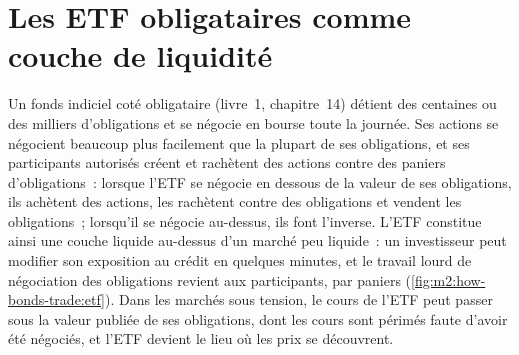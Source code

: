\section{Les ETF obligataires comme couche de liquidité}

Un fonds indiciel coté obligataire (livre~1, chapitre~14) détient des centaines ou des milliers
d'obligations et se négocie en bourse toute la journée. Ses actions se négocient beaucoup plus facilement que
la plupart de ses obligations, et ses participants autorisés créent et rachètent des actions contre
des paniers d'obligations~: lorsque l'ETF se négocie en dessous de la valeur de ses obligations, ils achètent des actions,
les rachètent contre des obligations et vendent les obligations~; lorsqu'il se négocie au-dessus, ils font l'inverse.
L'ETF constitue ainsi une couche liquide au-dessus d'un marché peu liquide~: un investisseur peut modifier
son exposition au crédit en quelques minutes, et le travail lourd de négociation des obligations revient
aux participants, par paniers (\cref{fig:m2:how-bonds-trade:etf}). Dans les marchés sous tension,
le cours de l'ETF peut passer sous la valeur publiée de ses obligations, dont les cours sont
périmés faute d'avoir été négociés, et l'ETF devient le lieu où les prix
se découvrent.

\begin{omfigure}
\centering
{}

\label{fig:m2:how-bonds-trade:etf}
\end{omfigure}

